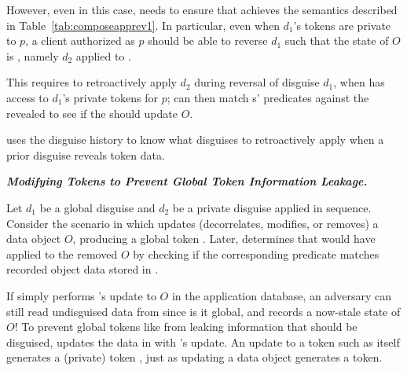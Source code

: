 However, even in this case, \sys needs to ensure that  achieves the semantics described in
Table~\ref{tab:composeapprev1}. In particular, even when $d_1$'s tokens are private to $p$, a client
authorized as $p$ should be able to reverse $d_1$ such that the state of $O$ is \ohist{[\app{d_2}]},
namely $d_2$ applied to \ostart. 

This requires \sys to retroactively apply $d_2$ during reversal of disguise $d_1$, when \sys has
access to $d_1$'s private tokens for $p$; \sys can then match s' predicates against the
revealed \ostart to see if the  should update $O$.

\sys uses the disguise history to know what disguises to retroactively apply when a prior disguise
reveals token data.

\vspace{6pt}\noindent\textbf{\emph{Modifying Tokens to Prevent Global Token Information Leakage.}}
%
%
%

Let $d_1$ be a global disguise and $d_2$ be a private disguise applied in sequence.
Consider the scenario in which  updates (decorrelates, modifies, or removes) a data object
$O$, producing a global token . Later, \sys determines that  would have applied to the
removed $O$ by checking if the corresponding  predicate matches recorded object data stored in .

If \sys simply performs 's update to $O$ in the application database, an adversary can still
read undisguised data from  since is it global, and records a now-stale state of $O$!
%
%
To prevent global tokens like  from leaking information that should be disguised, \sys
updates the data in  with 's update. An update to a token such as 
itself generates a (private) token , just as updating a data object generates a token.

